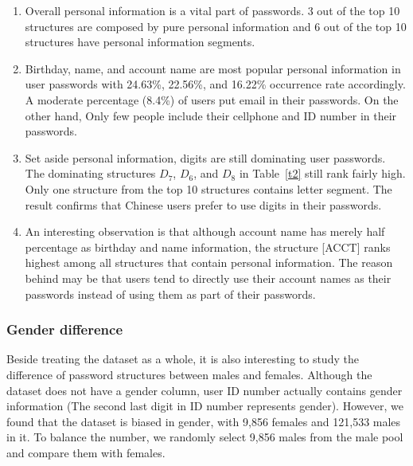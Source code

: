 \begin{enumerate}[leftmargin=*]
\item Overall personal information is a vital part of passwords. 3 out of the top 10 structures are composed by pure personal information and 6 out of the top 10 structures have personal information segments. 

\item Birthday, name, and account name are most popular personal information in user passwords with 24.63\%, 22.56\%, and 16.22\% occurrence rate accordingly. A moderate percentage (8.4\%) of users put email in their passwords. On the other hand, Only few people include their cellphone and ID number in their passwords.  

\item Set aside personal information, digits are still dominating user passwords. The dominating structures $D_7$, $D_6$, and $D_8$ in Table~\ref{t2} still rank fairly high. Only one structure from the top 10 structures contains letter segment. The result confirms that Chinese users prefer to use digits in their passwords.

\item An interesting observation is that although account name has merely half percentage as birthday and name information, the structure [ACCT] ranks highest among all structures that contain personal information. The reason behind may be that users tend to directly use their account names as their passwords instead of using them as part of their passwords. 
\end{enumerate}

\subsubsection{Gender difference}
\label{genderdifference}
Beside treating the dataset as a whole, it is also interesting to study the difference of password structures between males and females. Although the dataset does not have a gender column, user ID number actually contains gender information (The second last digit in ID number represents gender). However, we found that the dataset is biased in gender, with 9,856 females and 121,533 males in it. To balance the number, we randomly select 9,856 males from the male pool and compare them with females. 

